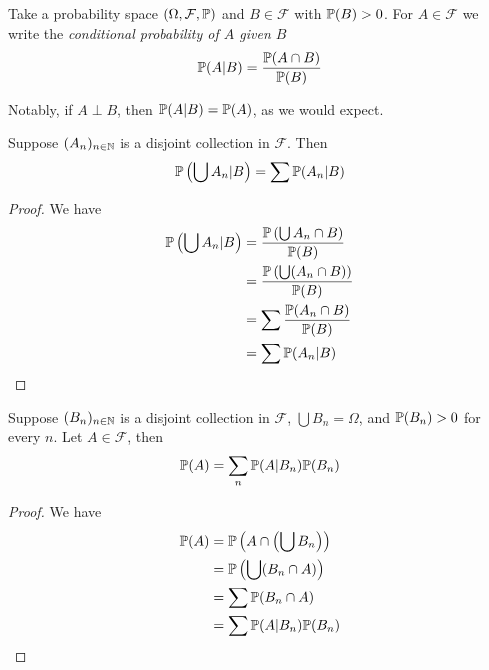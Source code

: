 \documentclass{../../template/note}
\begin{document}
    \begin{definition}
        Take a probability space \((\Omega, \mathcal F, \mathbb P)\) and \(B \in \mathcal F\) with \(\mathbb P(B) > 0\). For \(A \in \mathcal F\) we write the \emph{conditional probability of \(A\) given \(B\)} 
        \begin{align*}
            \mathbb P(A |  B) = \frac{\mathbb P(A \cap B)}{\mathbb P(B)}
        \end{align*}
    \end{definition}
    
    \begin{remark*}
        Notably, if \(A \perp B\), then \(\mathbb P(A |  B) = \mathbb P(A)\), as we would expect.
    \end{remark*}
    
    \begin{proposition}
        Suppose \((A_n)_{n \in \mathbb N}\) is a disjoint collection in \(\mathcal F\). Then
        \begin{align*}
            \mathbb P\left(\bigcup A_n |  B \right) = \sum \mathbb P(A_n |  B)
        \end{align*}
    \end{proposition}
    
    \begin{proof}
        We have
        \begin{align*}
            \mathbb P\left(\bigcup A_n |  B\right) &= \frac{\mathbb P\left(\bigcup A_n \cap B\right)}{\mathbb P(B)} \\
            &= \frac{\mathbb P\left(\bigcup (A_n \cap B)\right)}{\mathbb P(B)} \\
            &= \sum \frac{\mathbb P(A_n \cap B)}{\mathbb P(B)} \\
            &= \sum \mathbb P(A_n |  B)
        \end{align*}
    \end{proof}
    
    \begin{proposition}
        Suppose \((B_n)_{n \in \mathbb N}\) is a disjoint collection in \(\mathcal F\), \(\bigcup B_n = \Omega\), and \(\mathbb P(B_n) > 0\) for every \(n\). Let \(A \in \mathcal F\), then
        \begin{align*}
            \mathbb P(A) = \sum_n \mathbb P(A |  B_n) \mathbb P(B_n)
        \end{align*}
    \end{proposition}

    \begin{proof}
        We have
        \begin{align*}
            \mathbb P(A) &= \mathbb P\left(A \cap \left(\bigcup B_n\right)\right) \\
            &= \mathbb P\left(\bigcup (B_n \cap A)\right) \\
            &= \sum \mathbb P(B_n \cap A) \\
            &= \sum \mathbb P(A |  B_n) \mathbb P(B_n)
        \end{align*}
    \end{proof}
    
\end{document}
